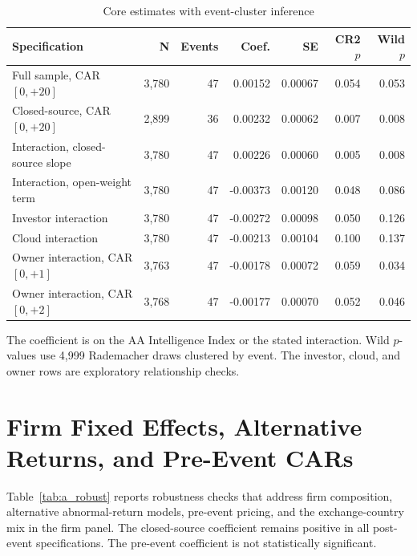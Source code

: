\documentclass[12pt]{article}
\begin{document}
\begin{table}[htbp]
\centering
\caption{Core estimates with event-cluster inference}
\label{tab:a_core}
\begin{threeparttable}
\begin{tabular}{lrrrrrr}
\toprule
Specification & N & Events & Coef. & SE & CR2 $p$ & Wild $p$ \\
\midrule
Full sample, CAR$[0,{+}20]$ & 3,780 & 47 & 0.00152 & 0.00067 & 0.054 & 0.053 \\
Closed-source, CAR$[0,{+}20]$ & 2,899 & 36 & 0.00232 & 0.00062 & 0.007 & 0.008 \\
Interaction, closed-source slope & 3,780 & 47 & 0.00226 & 0.00060 & 0.005 & 0.008 \\
Interaction, open-weight term & 3,780 & 47 & -0.00373 & 0.00120 & 0.048 & 0.086 \\
Investor interaction & 3,780 & 47 & -0.00272 & 0.00098 & 0.050 & 0.126 \\
Cloud interaction & 3,780 & 47 & -0.00213 & 0.00104 & 0.100 & 0.137 \\
Owner interaction, CAR$[0,{+}1]$ & 3,763 & 47 & -0.00178 & 0.00072 & 0.059 & 0.034 \\
Owner interaction, CAR$[0,{+}2]$ & 3,768 & 47 & -0.00177 & 0.00070 & 0.052 & 0.046 \\
\bottomrule
\end{tabular}
\begin{tablenotes}[flushleft]\footnotesize
\item The coefficient is on the AA Intelligence Index or the stated interaction.
Wild $p$-values use 4,999 Rademacher draws clustered by event. The investor,
cloud, and owner rows are exploratory relationship checks.
\end{tablenotes}
\end{threeparttable}
\end{table}

\section{Firm Fixed Effects, Alternative Returns, and Pre-Event CARs}
\label{app:robust}

Table~\ref{tab:a_robust} reports robustness checks that address firm composition,
alternative abnormal-return models, pre-event pricing, and the exchange-country
mix in the firm panel. The closed-source coefficient remains positive in all
post-event specifications. The pre-event coefficient is not statistically
significant.
\end{document}
